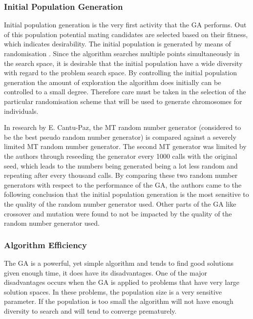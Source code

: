 \subsubsection{Initial Population Generation}
Initial population generation is the very first activity that the \gls{GA} performs. Out of this population potential mating candidates are selected based on their fitness, which indicates desirability. The initial population is generated by means of randomisation \cite{SelfAdaptiveGA}. Since the algorithm searches multiple points simultaneously in the search space, it is desirable that the initial population have a wide diversity with regard to the problem search space\cite{CombinedBranchBoundGA,DistributedHierarchicalGA}. By controlling the initial population generation the amount of exploration the algorithm does initially can be controlled to a small degree\cite{CombinedBranchBoundGA}. Therefore care must be taken in the selection of the particular randomisation scheme that will be used to generate chromosomes for individuals.

In research by E. Cantu-Paz, the \gls{MT} random number generator (considered to be the best pseudo random number generator) is compared against a severely limited \gls{MT} random number generator\cite{OnRandomGA}. The second \gls{MT} generator was limited by the authors through reseeding the generator every 1000 calls with the original seed, which leads to the numbers being generated being a lot less random and repeating after every thousand calls\cite{OnRandomGA, RLRandomGA}. By comparing these two random number generators with respect to the performance of the \gls{GA}, the authors came to the following conclusion that the initial population generation is the most sensitive to the quality of the random number generator used\cite{OnRandomGA}. Other parts of the \gls{GA} like crossover and mutation were found to not be impacted by the quality of the random number generator used\cite{OnRandomGA, RLRandomGA}.

\subsubsection{Algorithm Efficiency}
The \gls{GA} is a powerful, yet simple algorithm and tends to find good solutions given enough time, it does have its disadvantages. One of the major disadvantages occurs when the \gls{GA} is applied to problems that have very large solution spaces. In these problems, the population size is a very sensitive parameter\cite{AdaptiveSAGA,HetergeneousGA,SelfAdaptiveDataMiningGA,PatternDetectionGA}. If the population is too small the algorithm will not have enough diversity to search and will tend to converge prematurely. 

